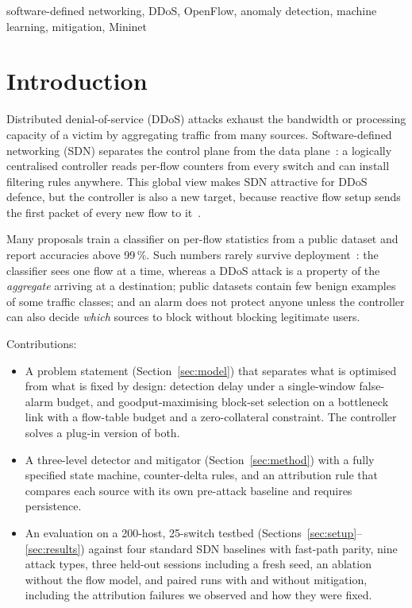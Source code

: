 \documentclass[conference]{IEEEtran}
\begin{document}
\begin{IEEEkeywords}
software-defined networking, DDoS, OpenFlow, anomaly detection, machine learning, mitigation, Mininet
\end{IEEEkeywords}

\section{Introduction}
Distributed denial-of-service (DDoS) attacks exhaust the bandwidth or processing capacity of a victim by aggregating traffic from many sources. Software-defined networking (SDN) separates the control plane from the data plane~\cite{mckeown2008openflow,kreutz2015sdn}: a logically centralised controller reads per-flow counters from every switch and can install filtering rules anywhere. This global view makes SDN attractive for DDoS defence, but the controller is also a new target, because reactive flow setup sends the first packet of every new flow to it~\cite{shin2013avant,wang2015floodguard,yan2016sdn}.

Many proposals train a classifier on per-flow statistics from a public dataset and report accuracies above 99\,\%. Such numbers rarely survive deployment~\cite{sommer2010outside,arp2022dos}: the classifier sees one flow at a time, whereas a DDoS attack is a property of the \emph{aggregate} arriving at a destination; public datasets contain few benign examples of some traffic classes; and an alarm does not protect anyone unless the controller can also decide \emph{which} sources to block without blocking legitimate users.

Contributions:
\begin{itemize}
\item A problem statement (Section~\ref{sec:model}) that separates what is optimised from what is fixed by design: detection delay under a single-window false-alarm budget, and goodput-maximising block-set selection on a bottleneck link with a flow-table budget and a zero-collateral constraint. The controller solves a plug-in version of both.
\item A three-level detector and mitigator (Section~\ref{sec:method}) with a fully specified state machine, counter-delta rules, and an attribution rule that compares each source with its own pre-attack baseline and requires persistence.
\item An evaluation on a 200-host, 25-switch testbed (Sections~\ref{sec:setup}--\ref{sec:results}) against four standard SDN baselines with fast-path parity, nine attack types, three held-out sessions including a fresh seed, an ablation without the flow model, and paired runs with and without mitigation, including the attribution failures we observed and how they were fixed.
\end{itemize}
\end{document}
